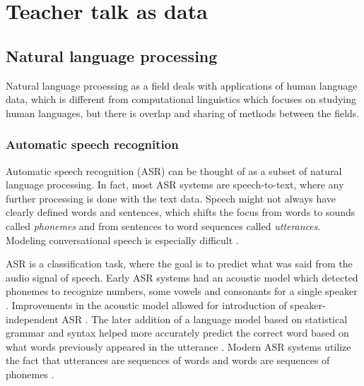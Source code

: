 \documentclass[utf8,english]{gradu3}
\begin{document}
\chapter{Teacher talk as data}
\label{chap:speech}


\section{Natural language processing}

Natural language prcoessing as a field deals with applications of human language data, which is different from computational linguistics which focuses on studying human languages, but there is overlap and sharing of methods between the fields.

\subsection{Automatic speech recognition}
Automatic speech recognition (ASR) can be thought of as a subset of natural language processing. In fact, most ASR systems are speech-to-text, where any further processing is done with the text data. Speech might not always have clearly defined words and sentences, which shifts the focus from words to sounds called \emph{phonemes} and from sentences to word sequences called \emph{utterances}. Modeling conversational speech is especially difficult \parencite{kurimoModelingUnderresourcedLanguages2017}.

ASR is a classification task, where the goal is to predict what was said from the audio signal of speech. Early ASR systems had an acoustic model which detected phonemes to recognize numbers, some vowels and consonants for a single speaker \parencite{juangAutomaticSpeechRecognition2005}. Improvements in the acoustic model allowed for introduction of speaker-independent ASR \parencite{benzeghibaAutomaticSpeechRecognition2007,juangAutomaticSpeechRecognition2005}. The later addition of a language model based on statistical grammar and syntax helped more accurately predict the correct word based on what words previously appeared in the utterance \parencite{juangAutomaticSpeechRecognition2005}. Modern ASR systems utilize the fact that utterances are sequences of words and words are sequences of phonemes \parencite{bengioWordEmbeddingsSpeech2014}. 
\end{document}
